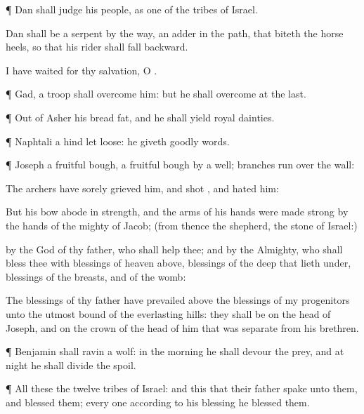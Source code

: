 {\par }{\PP {}¶
Dan shall
judge his
people, as
one of the
tribes of
Israel.

Dan shall be a
serpent by the
way, an
adder in the
path, that
biteth the
horse
heels, so that his
rider shall
fall
backward.

I have waited
for thy
salvation, O
{}.


\par }{\PP {}¶
Gad, a
troop shall
overcome him: but he shall
overcome at the
last.


\par }{\PP {}¶ Out of
Asher his
bread
{}
fat, and he shall
yield
royal
dainties.


\par }{\PP {}¶
Naphtali
{} a
hind let
loose: he
giveth
goodly
words.


\par }{\PP {}¶
Joseph
{} a
fruitful
bough,
{} a
fruitful
bough by a
well;
{}
branches
run over the
wall:

The
archers have sorely grieved
him, and
shot
{}, and hated
him:

But his
bow
abode in
strength, and the
arms of his
hands were made
strong by the
hands of the
mighty
{} of
Jacob; (from thence
{} the
shepherd, the
stone of
Israel:)

 by the
God of thy
father, who shall
help thee; and
by the
Almighty, who shall
bless thee with
blessings of
heaven
above,
blessings of the
deep that
lieth under,
blessings of the
breasts, and of the
womb:

The
blessings of thy
father have
prevailed above the
blessings of my
progenitors unto the utmost
bound of the
everlasting
hills: they shall be on the
head of
Joseph, and on the crown of the
head of him that was
separate from his
brethren.


\par }{\PP {}¶
Benjamin shall
ravin
{} a
wolf: in the
morning he shall
devour the
prey, and at
night he shall
divide the
spoil.


\par }{\PP {}¶ All these
{} the
twelve
tribes of
Israel: and this
{} that their
father
spake unto them, and
blessed them;
every
one according to his
blessing he
blessed them.

}
